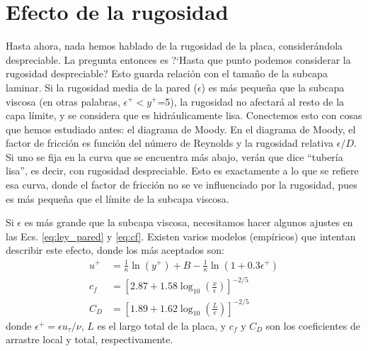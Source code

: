 \section*{Efecto de la rugosidad}

Hasta ahora, nada hemos hablado de la rugosidad de la placa, considerándola despreciable.
La pregunta entonces es \mbox{?`}Hasta que punto podemos considerar la rugosidad despreciable? Esto guarda relación con el tamaño de la subcapa laminar.
Si la rugosidad media de la pared ($\epsilon$) es más pequeña que la subcapa viscosa (en otras palabras, $\epsilon^+<y^+$=5), la rugosidad no afectará al resto de la capa límite, y se considera que es hidráulicamente lisa.
Conectemos esto con cosas que hemos estudiado antes: el diagrama de Moody.
En el diagrama de Moody, el factor de fricción es función del número de Reynolds y la rugosidad relativa $\epsilon/D$.
Si uno se fija en la curva que se encuentra más abajo, verán que dice ``tubería lisa'', es decir, con rugosidad despreciable. 
Esto es exactamente a lo que se refiere esa curva, donde el factor de fricción no se ve influenciado por la rugosidad, pues es más pequeña que el límite de la subcapa viscosa.

Si $\epsilon$ es más grande que la subcapa viscosa, necesitamos hacer algunos ajustes en las Ecs. \eqref{eq:ley_pared} y \eqref{eq:cf}.
Existen varios modelos (empíricos) que intentan describir este efecto, donde los más aceptados son:
%
\begin{align}
u^+ &= \frac{1}{\kappa} \ln(y^+) + B - \frac{1}{\kappa}\ln(1+0.3\epsilon^+)\nonumber\\
c_f &= \left[2.87+1.58\log_{10}\left(\frac{x}{\epsilon}\right)\right]^{-2/5}\nonumber\\
C_D &= \left[1.89+1.62\log_{10}\left(\frac{L}{\epsilon}\right)\right]^{-2/5}
\end{align}
%
donde $\epsilon^+ =\epsilon u_\tau/\nu$, $L$ es el largo total de la placa, y $c_f$ y $C_D$ son los coeficientes de arrastre local y total, respectivamente.
